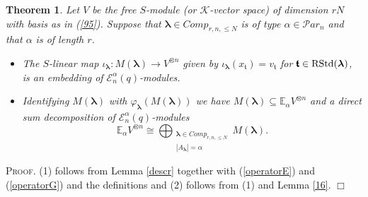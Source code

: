 \documentclass[10pt,a4,twoside,hidelinks,rm]{article}
\newcommand{\kk}{\mathcal{K}}
\newcommand{\Par}{{\mathcal Par}_n}
\newcommand{\bT}{\pmb{\mathfrak{t}}}
\newcommand{\MCN}{{ {Comp}}_{r,n, \le N}}
\newcommand{\rstd}{{\rm RStd}}
\newcommand{\Ea}{ {\mathcal E}_n^{\alpha}(q)}
\newcommand\blambda{{\boldsymbol\lambda}}
\newcommand\be{\mathbb{E}}
\theoremstyle{plain}
\newtheorem{teo}{Theorem}%
\newenvironment{demo}
{\textsc{Proof.}} {\quad \hfill $\Box$}
\begin{document}
\begin{teo}\label{17}
Let $ V $ be the free $ S$-module (or $ \kk $-vector space) of dimension $ rN $ with basis as in 
(\ref{95}). Suppose that 
$ \blambda \in \MCN $ is of type $ \alpha \in \Par$ and that $ \alpha $ is of length $ r $.
  \begin{itemize}
\setlength\itemsep{-0.5em}
\item[(1)] The $S$-linear map $\iota_{\blambda}: M(\blambda) \rightarrow V^{\otimes n} $
  given by $\iota_{\blambda}(x_{\bT}) = v_{\bT} $ for $ \bT \in \rstd(\blambda) $, is
  an embedding of $ \Ea$-modules. 
  \newline
\item[(2)] Identifying $ M(\blambda) $ with $ \varphi_{\blambda}( M(\blambda))$ we have
 $ M(\blambda) \subseteq  \be_{\alpha}V^{\otimes n} $ and 
  a direct sum decomposition of $ \Ea $-modules
  \begin{equation}\label{directsun}
   \be_{\alpha} V^{\otimes n} \cong \bigoplus_{\substack{\blambda \in \MCN\\ |A_{\blambda}|  =\alpha}} M(\blambda).
    \end{equation}
\end{itemize}
\end{teo}
\begin{demo}
  (1) follows from Lemma \ref{descr} together with (\ref{operatorE}) and (\ref{operatorG}) and the definitions
  and (2) follows from (1) and Lemma \ref{16}.
\end{demo}
\end{document}
